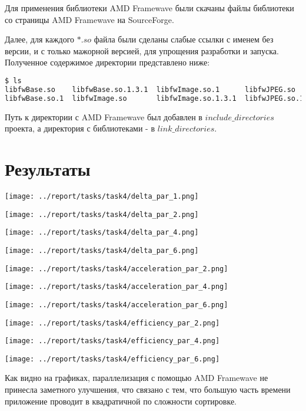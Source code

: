 \documentclass[14pt, a4paper, oneside, final]{extarticle}
\begin{document}
Для применения библиотеки AMD Framewave были скачаны файлы библиотеки со страницы AMD Framewave на SourceForge.

Далее, для каждого $*.so$ файла были сделаны слабые ссылки с именем без версии, и с только мажорной версией, для упрощения разработки и запуска. Полученное содержимое директории представлено ниже:
 \begin{lstlisting}[language=Bash]
$ ls
libfwBase.so    libfwBase.so.1.3.1  libfwImage.so.1      libfwJPEG.so    libfwJPEG.so.1.3.1  libfwSignal.so.1      libfwVideo.so    libfwVideo.so.1.3.1
libfwBase.so.1  libfwImage.so       libfwImage.so.1.3.1  libfwJPEG.so.1  libfwSignal.so      libfwSignal.so.1.3.1  libfwVideo.so.1
 \end{lstlisting}

 Путь к директории с AMD Framewave был добавлен в $include\_directories$ проекта, а директория с библиотеками - в $link\_directories$.

\section*{Результаты}

\texttt{[image: ../report/tasks/task4/delta\_par\_1.png]}

\texttt{[image: ../report/tasks/task4/delta\_par\_2.png]}

\texttt{[image: ../report/tasks/task4/delta\_par\_4.png]}

\texttt{[image: ../report/tasks/task4/delta\_par\_6.png]}

\texttt{[image: ../report/tasks/task4/acceleration\_par\_2.png]}

\texttt{[image: ../report/tasks/task4/acceleration\_par\_4.png]}

\texttt{[image: ../report/tasks/task4/acceleration\_par\_6.png]}

\texttt{[image: ../report/tasks/task4/efficiency\_par\_2.png]}

\texttt{[image: ../report/tasks/task4/efficiency\_par\_4.png]}

\texttt{[image: ../report/tasks/task4/efficiency\_par\_6.png]}

Как видно на графиках, параллелизация с помощью AMD Framewave не принесла заметного улучшения, что связано с тем, что большую часть времени приложение проводит в квадратичной по сложности сортировке.
\end{document}
